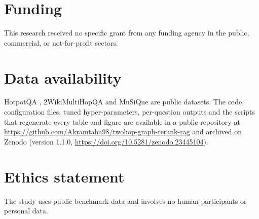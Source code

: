 \documentclass[a4paper,fleqn]{cas-sc}
\newcommand{\repourl}{https://github.com/Akramtaha98/twohop-graph-rerank-rag}
\begin{document}
\section*{Funding}
This research received no specific grant from any funding agency in the public, commercial, or not-for-profit sectors.

\section*{Data availability}
HotpotQA \citep{yang2018hotpotqa}, 2WikiMultiHopQA \citep{ho2020twowiki} and MuSiQue \citep{trivedi2022musique} are public datasets. The code, configuration files, tuned hyper-parameters, per-question outputs and the scripts that regenerate every table and figure are available in a public repository at \url{\repourl} and archived on Zenodo (version 1.1.0, \url{https://doi.org/10.5281/zenodo.23445104}).

\section*{Ethics statement}
The study uses public benchmark data and involves no human participants or personal data.

\printcredits



\end{document}

